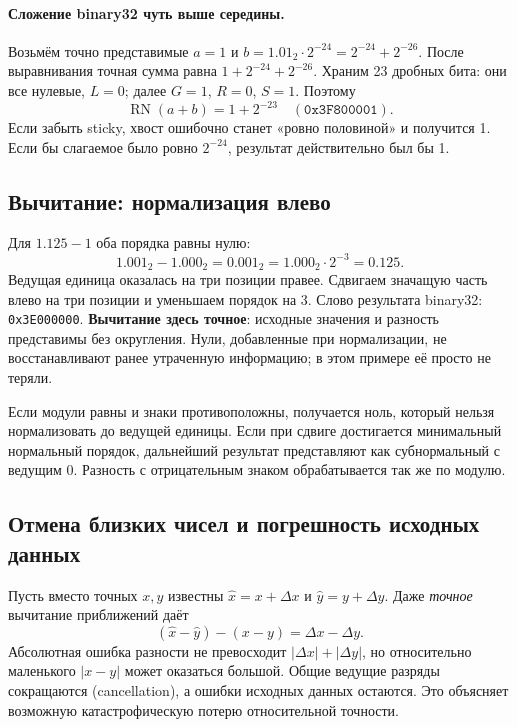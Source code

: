 \paragraph{Сложение binary32 чуть выше середины.}
Возьмём точно представимые $a=1$ и
$b=1.01_2\cdot2^{-24}=2^{-24}+2^{-26}$. После выравнивания
точная сумма равна $1+2^{-24}+2^{-26}$.
Храним 23 дробных бита: они все нулевые, $L=0$; далее
$G=1$, $R=0$, $S=1$. Поэтому
\[
\operatorname{RN}(a+b)=1+2^{-23}
\quad (\texttt{0x3F800001}).
\]
Если забыть sticky, хвост ошибочно станет «ровно половиной» и получится 1.
Если бы слагаемое было ровно $2^{-24}$, результат действительно был бы 1.

\subsection{Вычитание: нормализация влево}
Для $1.125-1$ оба порядка равны нулю:
\[
1.001_2-1.000_2=0.001_2=1.000_2\cdot2^{-3}=0.125.
\]
Ведущая единица оказалась на три позиции правее. Сдвигаем значащую
часть влево на три позиции и уменьшаем порядок на 3. Слово результата
binary32: \texttt{0x3E000000}. \textbf{Вычитание здесь точное}:
исходные значения и разность представимы без округления.
Нули, добавленные при нормализации, не восстанавливают ранее утраченную
информацию; в этом примере её просто не теряли.

Если модули равны и знаки противоположны, получается ноль, который
нельзя нормализовать до ведущей единицы. Если при сдвиге достигается
минимальный нормальный порядок, дальнейший результат представляют
как субнормальный с ведущим 0. Разность с отрицательным знаком
обрабатывается так же по модулю.

\subsection{Отмена близких чисел и погрешность исходных данных}
Пусть вместо точных $x,y$ известны $\hat x=x+\Delta x$ и
$\hat y=y+\Delta y$. Даже \emph{точное} вычитание приближений даёт
\[
 (\hat x-\hat y)-(x-y)=\Delta x-\Delta y.
\]
Абсолютная ошибка разности не превосходит
$|\Delta x|+|\Delta y|$, но относительно маленького $|x-y|$ может
оказаться большой. Общие ведущие разряды сокращаются (cancellation),
а ошибки исходных данных остаются. Это объясняет возможную
катастрофическую потерю относительной точности.


